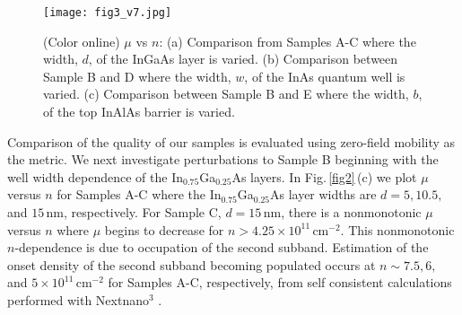 \documentclass[
floatfix,
aps,
prl,
twocolumn,
superscriptaddress,
amssymb,
 groupaddress,
]{revtex4}
\begin{document}
\begin{figure}[t]
\vspace{-0.1 in}
\texttt{[image: fig3\_v7.jpg]}
\vspace{-0.25 in}
\caption{(Color online)
$\mu$ vs $n$:
(a) Comparison from Samples A-C where the width, $d$, of the InGaAs layer is varied.
(b) Comparison between Sample B and D where the width, $w$, of the InAs quantum well is varied.
(c) Comparison between Sample B and E where the width, $b$, of the top InAlAs barrier is varied.
} 
\vspace{-0.1 in}
\label{fig3}
\end{figure}
Comparison of the quality of our samples is evaluated using zero-field mobility as the metric.
We next investigate perturbations to Sample B beginning with the well width dependence of the In$_{0.75}$Ga$_{0.25}$As layers.
In Fig.\,\ref{fig2}\,(c) we plot $\mu$ versus $n$ for Samples A-C where the In$_{0.75}$Ga$_{0.25}$As layer widths are $d=5,10.5,\,$and $15\,$nm, respectively.
For Sample C, $d=15\,$nm, there is a nonmonotonic $\mu$ versus $n$ where $\mu$ begins to decrease for $n > 4.25 \times 10^{11}\,$cm$^{-2}$.
This nonmonotonic $n$-dependence is due to occupation of the second subband.
Estimation of the onset density of the second subband becoming populated occurs at $n \sim 7.5, 6,$ and $5 \times 10^{11}\,$cm$^{-2}$ for Samples A-C, respectively, from self consistent calculations performed with Nextnano$^{3}$ \citep{nextnano}.
\end{document}
